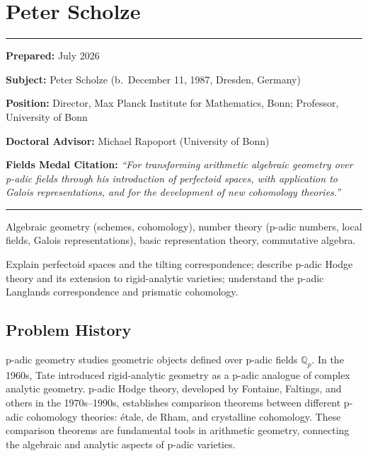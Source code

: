 \chapter{Peter Scholze}\label{ch2018peterscholze:peter-scholze-fields-medal-2018-a-comprehensive-report-on-his-work-and-impact}

\begin{center}\rule{0.5\linewidth}{0.5pt}\end{center}

\textbf{Prepared:} July 2026

\textbf{Subject:} Peter Scholze (b.\ December 11, 1987, Dresden, Germany)

\textbf{Position:} Director, Max Planck Institute for Mathematics, Bonn; Professor, University of Bonn

\textbf{Doctoral Advisor:} Michael Rapoport (University of Bonn)

\textbf{Fields Medal Citation:} \emph{``For transforming arithmetic algebraic geometry over p-adic fields through his introduction of perfectoid spaces, with application to Galois representations, and for the development of new cohomology theories.''}

\begin{center}\rule{0.5\linewidth}{0.5pt}\end{center}

\begin{prereqs}
Algebraic geometry (schemes, cohomology), number theory (p-adic numbers, local fields, Galois representations), basic representation theory, commutative algebra.
\end{prereqs}

\begin{objectives}
Explain perfectoid spaces and the tilting correspondence; describe p-adic Hodge theory and its extension to rigid-analytic varieties; understand the p-adic Langlands correspondence and prismatic cohomology.
\end{objectives}

\section{Problem History}

p-adic geometry studies geometric objects defined over p-adic fields $\mathbb{Q}_p$. In the 1960s, Tate introduced rigid-analytic geometry as a p-adic analogue of complex analytic geometry. p-adic Hodge theory, developed by Fontaine, Faltings, and others in the 1970s--1990s, establishes comparison theorems between different p-adic cohomology theories: \'{e}tale, de Rham, and crystalline cohomology. These comparison theorems are fundamental tools in arithmetic geometry, connecting the algebraic and analytic aspects of p-adic varieties.

